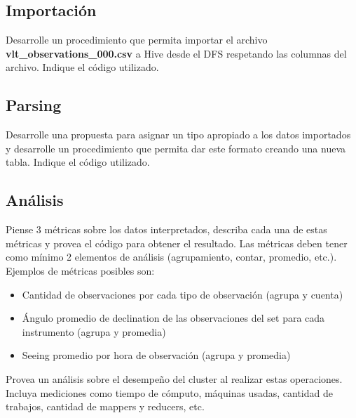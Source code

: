 \documentclass[12pt,letterpaper,twoside]{article}
\begin{document}
\subsection{Importación}

{\color{red} Desarrolle un procedimiento que permita importar el archivo \textbf{vlt\_observations\_000.csv} a Hive desde el DFS respetando las columnas del archivo. Indique el código utilizado.}

\subsection{Parsing}

{\color{red} Desarrolle una propuesta para asignar un tipo apropiado a los datos importados y desarrolle un procedimiento que permita dar este formato creando una nueva tabla. Indique el código utilizado.}

\subsection{Análisis}

{\color{red} Piense 3 métricas sobre los datos interpretados, describa cada una de estas métricas y provea el código para obtener el resultado. Las métricas deben tener como mínimo 2 elementos de análisis (agrupamiento, contar, promedio, etc.). Ejemplos de métricas posibles son:
\begin{itemize}
  \item Cantidad de observaciones por cada tipo de observación (agrupa y cuenta)
  \item Ángulo promedio de declination de las observaciones del set para cada instrumento (agrupa y promedia)
  \item Seeing promedio por hora de observación (agrupa y promedia)
\end{itemize}
Provea un análisis sobre el desempeño del cluster al realizar estas operaciones. Incluya mediciones como tiempo de cómputo, máquinas usadas, cantidad de trabajos, cantidad de mappers y reducers, etc.}
\end{document}

